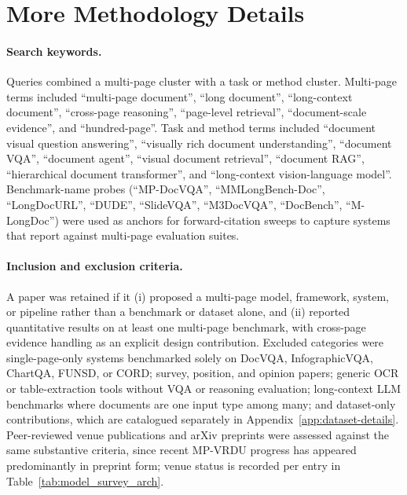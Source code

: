 \documentclass[11pt]{article}
\begin{document}
\clearpage 

\newpage
\appendix



\section{More Methodology Details}
\label{app:methodology}

\paragraph{Search keywords.}
Queries combined a multi-page cluster with a task or method cluster. Multi-page terms included ``multi-page document'', ``long document'', ``long-context document'', ``cross-page reasoning'', ``page-level retrieval'', ``document-scale evidence'', and ``hundred-page''. Task and method terms included ``document visual question answering'', ``visually rich document understanding'', ``document VQA'', ``document agent'', ``visual document retrieval'', ``document RAG'', ``hierarchical document transformer'', and ``long-context vision-language model''. Benchmark-name probes (``MP-DocVQA'', ``MMLongBench-Doc'', ``LongDocURL'', ``DUDE'', ``SlideVQA'', ``M3DocVQA'', ``DocBench'', ``M-LongDoc'') were used as anchors for forward-citation sweeps to capture systems that report against multi-page evaluation suites.

\paragraph{Inclusion and exclusion criteria.}
A paper was retained if it (i) proposed a multi-page model, framework, system, or pipeline rather than a benchmark or dataset alone, and (ii) reported quantitative results on at least one multi-page benchmark, with cross-page evidence handling as an explicit design contribution. Excluded categories were single-page-only systems benchmarked solely on DocVQA, InfographicVQA, ChartQA, FUNSD, or CORD; survey, position, and opinion papers; generic OCR or table-extraction tools without VQA or reasoning evaluation; long-context LLM benchmarks where documents are one input type among many; and dataset-only contributions, which are catalogued separately in Appendix~\ref{app:dataset-details}. Peer-reviewed venue publications and arXiv preprints were assessed against the same substantive criteria, since recent MP-VRDU progress has appeared predominantly in preprint form; venue status is recorded per entry in Table~\ref{tab:model_survey_arch}.
\end{document}
